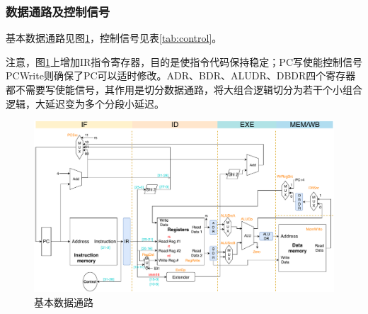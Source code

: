 \subsubsection{数据通路及控制信号}
\qquad 基本数据通路见图\ref{fig:datapath}，控制信号见表\ref{tab:control}。
\par 注意，图\ref{fig:datapath}上增加IR指令寄存器，目的是使指令代码保持稳定；PC写使能控制信号PCWrite则确保了PC可以适时修改。ADR、BDR、ALUDR、DBDR四个寄存器都不需要写使能信号，其作用是切分数据通路，将大组合逻辑切分为若干个小组合逻辑，大延迟变为多个分段小延迟。
\begin{figure}[H]
\centering
\includegraphics[width=\linewidth]{fig/Datapath-All.pdf}
\caption{基本数据通路}
\label{fig:datapath}
\end{figure}
